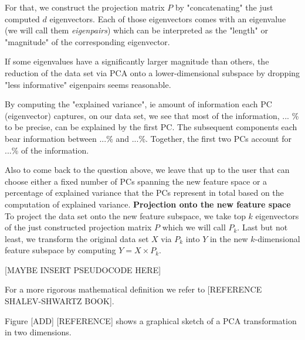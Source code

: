 \documentclass[journal, a4paper]{IEEEtran}
\begin{document}

For that, we construct the projection matrix \( P \) by "concatenating" the just computed \( d \) eigenvectors. Each of those eigenvectors comes with an eigenvalue (we will call them \textit{eigenpairs}) which can be interpreted as the "length" or "magnitude" of the corresponding eigenvector. 

If some eigenvalues have a significantly larger magnitude than others, the reduction of the data set via PCA onto a lower-dimensional subspace by dropping "less informative" eigenpairs seems reasonable.

By computing the "explained variance", ie amount of information each PC (eigenvector) captures, on our data set, we see that most of the information, ... \% to be precise, can be explained by the first PC. The subsequent components each bear information between ...\% and ...\%. Together, the first two PCs account for ...\% of the information.

Also to come back to the question above, we leave that up to the user that can choose either a fixed number of PCs spanning the new feature space or a percentage of explained variance that the PCs represent in total based on the computation of explained variance.
\newline
%
\textbf{Projection onto the new feature space}\\
To project the data set onto the new feature subspace, we take top \( k \) eigenvectors of the just constructed projection matrix \( P \) which we will call \( P_{k} \).
Last but not least, we transform the original data set \( X \) via \( P_{k} \) into \( Y \) in the new \(k\)-dimensional feature subspace by computing \( Y = X \times P_{k} \).

[MAYBE INSERT PSEUDOCODE HERE]

For a more rigorous mathematical definition we refer to [REFERENCE SHALEV-SHWARTZ BOOK].



Figure [ADD] [REFERENCE] shows a graphical sketch of a PCA transformation in two dimensions.
\end{document}
